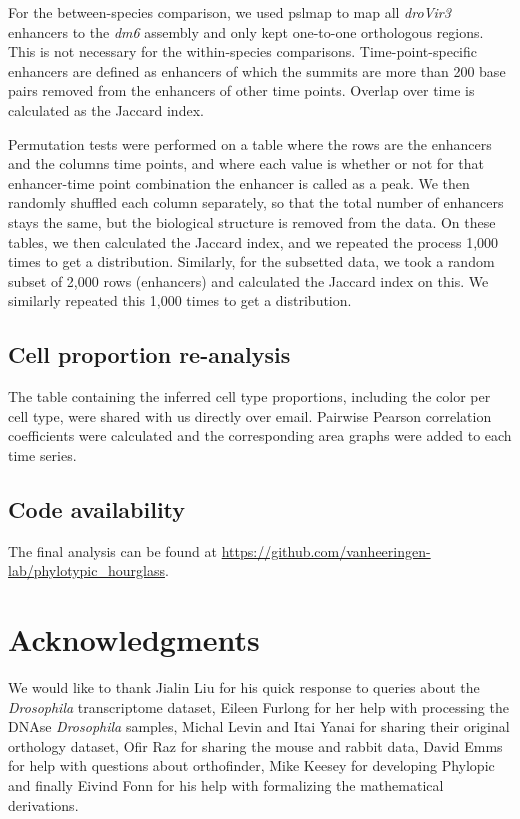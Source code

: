 For the between-species comparison, we used pslmap to map all \textit{droVir3} enhancers to the \textit{dm6} assembly and only kept one-to-one orthologous regions.  This is not necessary for the within-species comparisons. Time-point-specific enhancers are defined as enhancers of which the summits are more than 200 base pairs removed from the enhancers of other time points. Overlap over time is calculated as the Jaccard index.

Permutation tests were performed on a table where the rows are the enhancers and the columns time points, and where each value is whether or not for that enhancer-time point combination the enhancer is called as a peak. We then randomly shuffled each column separately, so that the total number of enhancers stays the same, but the biological structure is removed from the data. On these tables, we then calculated the Jaccard index, and we repeated the process 1,000 times to get a distribution. Similarly, for the subsetted data, we took a random subset of 2,000 rows (enhancers) and calculated the Jaccard index on this. We similarly repeated this 1,000 times to get a distribution.

\subsection{Cell proportion re-analysis}

The table containing the inferred cell type proportions, including the color per cell type, were shared with us directly over email. Pairwise Pearson correlation coefficients were calculated and the corresponding area graphs were added to each time series.

\subsection{Code availability}

The final analysis can be found at \url{https://github.com/vanheeringen-lab/phylotypic_hourglass}.

\section{Acknowledgments}

We would like to thank Jialin Liu for his quick response to queries about the \textit{Drosophila} transcriptome dataset, Eileen Furlong for her help with processing the DNAse \textit{Drosophila} samples, Michal Levin and Itai Yanai for sharing their original orthology dataset, Ofir Raz for sharing the mouse and rabbit data, David Emms for help with questions about orthofinder, Mike Keesey for developing Phylopic and finally Eivind Fonn for his help with formalizing the mathematical derivations.


